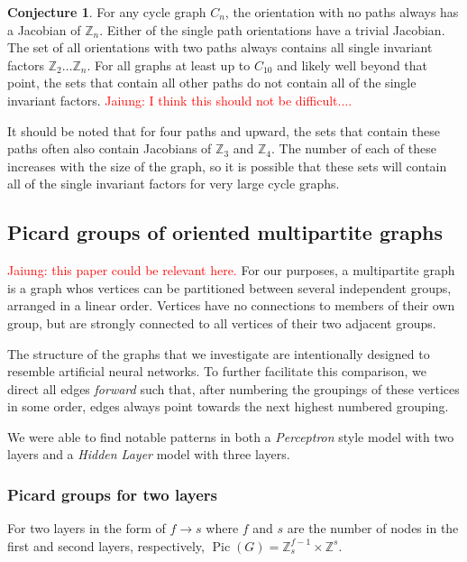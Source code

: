 \documentclass[11pt,reqno]{amsart}
\DeclareMathOperator{\Pic}{Pic}
\theoremstyle{definition}
\newtheorem{conj}[mydef]{Conjecture}
\theoremstyle{plain}
\begin{document}
\begin{conj}
For any cycle graph $C_n$, the orientation with no paths always has a Jacobian of $\mathbb{Z}_n$.
Either of the single path orientations have a trivial Jacobian.
The set of all orientations with two paths always contains all single invariant factors
$\mathbb{Z}_2\dots\mathbb{Z}_n$.  For all graphs at least up to $C_{10}$ and likely well beyond that
point, the sets that contain all other paths do not contain all of the single invariant factors. \textcolor{red}{Jaiung: I think this should not be difficult....}
\end{conj}

It should be noted that for four paths and upward, the sets that contain these paths often also contain
Jacobians of $\mathbb{Z}_3$ and $\mathbb{Z}_4$.  The number of each of these increases with the size of the
graph, so it is possible that these sets will contain all of the single invariant factors for very
large cycle graphs.

\subsection{Picard groups of oriented multipartite graphs}
\textcolor{red}{Jaiung: this paper \cite{jacobson2003critical} could be relevant here.}
For our purposes, a multipartite graph is a graph whos vertices can be partitioned between several independent
groups, arranged in a linear order.  Vertices have no connections to members of their own group, but are strongly
connected to all vertices of their two adjacent groups.

The structure of the graphs that we investigate are intentionally designed to resemble artificial neural networks.
To further facilitate this comparison, we direct all edges \textit{forward} such that, after numbering the groupings
of these vertices in some order, edges always point towards the next highest numbered grouping.

We were able to find notable patterns in both a \textit{Perceptron} style model with two layers and a
\textit{Hidden Layer} model with three layers.

\subsubsection{Picard groups for two layers}
For two layers in the form of $f \rightarrow s$ where $f$ and $s$ are the number of nodes in the first and
second layers, respectively, $\Pic(G) = \mathbb{Z}_{s}^{f-1} \times \mathbb{Z}^s$.
\end{document}
